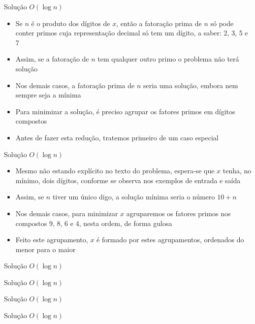 \begin{frame}[fragile]{Solução $O(\log n)$}

    \begin{itemize}
        \item Se $n$ é o produto dos dígitos de $x$, então a fatoração prima de $n$ só pode
            conter primos cuja representação decimal só tem um dígito, a saber: 2, 3, 5 e 7

        \item Assim, se a fatoração de $n$ tem qualquer outro primo o problema não
            terá solução

        \item Nos demais casos, a fatoração prima de $n$ seria uma solução, embora nem sempre
            seja a mínima

        \item Para minimizar a solução, é preciso agrupar os fatores primos em dígitos compostos

        \item Antes de fazer esta redução, tratemos primeiro de um caso especial
    \end{itemize}

\end{frame}


\begin{frame}[fragile]{Solução $O(\log n)$}

    \begin{itemize}
        \item Mesmo não estando explícito no texto do problema, espera-se que $x$ tenha, no 
            mínimo, dois dígitos, conforme se observa nos exemplos de entrada e saída

        \item Assim, se $n$ tiver um único digo, a solução mínima seria o número $10 + n$

        \item Nos demais casos, para minimizar $x$ agruparemos os fatores primos nos compostos
            9, 8, 6 e 4, nesta ordem, de forma gulosa

        \item Feito este agrupamento, $x$ é formado por estes agrupamentos, ordenados do
            menor para o maior
    \end{itemize}

\end{frame}

\begin{frame}[fragile]{Solução $O(\log n)$}
\end{frame}

\begin{frame}[fragile]{Solução $O(\log n)$}
\end{frame}

\begin{frame}[fragile]{Solução $O(\log n)$}
\end{frame}

\begin{frame}[fragile]{Solução $O(\log n)$}
\end{frame}
